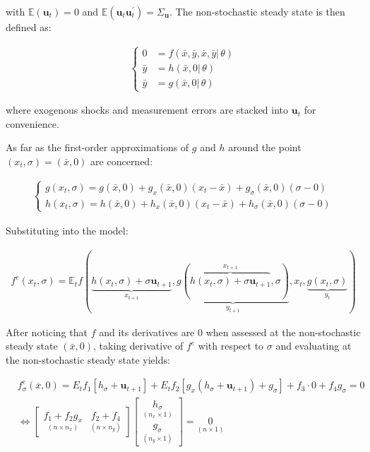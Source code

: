 \documentclass{pracamgr}
\numberwithin{equation}{section}
\begin{document}
with $\mathbb{E}(\mathbf{u}_{t}) = 0$ and $\mathbb{E}(\mathbf{u}_{t} \mathbf{u}_{t}^{'} ) = \Sigma_{\mathbf{u}}$. The non-stochastic steady state is then defined as:

\begin{align}
\left\{
\begin{array}{cl}
0 &= f \left(\bar{x}, \bar{y}, \bar{x}, \bar{y}| \, \theta \right) \\
\bar{y} &= h \left( \bar{x}, 0 | \, \theta \right) \\
\bar{y} &= g \left( \bar{x}, 0 | \, \theta \right)
\end{array}
\right.
\end{align}

where exogenous shocks and measurement errors are stacked into $\mathbf{u}_{t}$ for convenience.

As far as the first-order approximations of $g$ and $h$ around the point $(x_{t}, \sigma) = (\bar{x}, 0)$ are concerned:

\begin{align}
\left\{
\begin{array}{cl}
g(x_{t}, \sigma) = g(\bar{x}, 0) + g_{x}(\bar{x}, 0)(x_{t} - \bar{x}) + g_{\sigma}(\bar{x}, 0)(\sigma - 0) \\
h(x_{t}, \sigma) = h(\bar{x}, 0) + h_{x}(\bar{x}, 0)(x_{t} - \bar{x}) + h_{\sigma}(\bar{x}, 0)(\sigma - 0)
\end{array}
\right.
\end{align}

Substituting into the model:

\begin{align}
f^{e}(x_{t}, \sigma) = \mathbb{E}_{t} f \left( \underbrace{h(x_{t}, \sigma) + \sigma \mathbf{u}_{t+1}}_{x_{t+1}}, \underbrace{g \left( \overbrace{h\left(x_{t}, \sigma \right) + \sigma \mathbf{u}_{t+1}}^{x_{t+1}}, \sigma \right)}_{y_{t+1}}, x_{t}, \underbrace{g(x_{t}, \sigma)}_{y_{t}} \right)
\end{align}

After noticing that $f$ and its derivatives are 0 when assessed at the non-stochastic steady state $\left(\bar{x}, 0\right)$, taking derivative of $f^{e}$ with respect to $\sigma$ and evaluating at the non-stochastic steady state yields:

\begin{eqnarray}
&f^{e}_\sigma(\overline{x},0) = E_t f_1[h_\sigma + \mathbf{u}_{t+1}] + E_t f_2 [g_x(h_\sigma+ \mathbf{u}_{t+1})+g_\sigma] + f_3\cdot 0 + f_4 g_\sigma = 0 \nonumber \\
 &  \iff \begin{bmatrix} \underset{(n \times n_x)}{f_1 + f_2 g_x} & \underset{(n\times n_y)}{f_2 +f_4}\end{bmatrix} \begin{bmatrix} \underset{(n_x \times 1)}{h_\sigma} \\ \underset{(n_y \times 1)}{g_\sigma} \end{bmatrix} = \underset{(n \times 1)}{0}
  \end{eqnarray}
\end{document}
